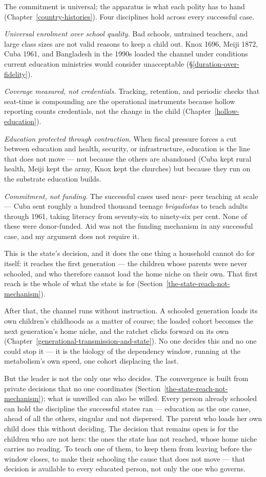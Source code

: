 \documentclass[12pt,letterpaper]{article}
\begin{document}
The commitment is universal; the apparatus is what each polity has
to hand (Chapter~\ref{country-histories}). Four disciplines hold
across every successful case.

\emph{Universal enrolment over school quality.} Bad schools,
untrained teachers, and large class sizes are not valid reasons to
keep a child out. Knox 1696, Meiji 1872, Cuba 1961, and Bangladesh
in the 1990s loaded the channel under conditions current education
ministries would consider unacceptable
(\S\ref{duration-over-fidelity}).

\emph{Coverage measured, not credentials.} Tracking, retention, and
periodic checks that seat-time is compounding are the operational
instruments because hollow reporting counts credentials, not the
change in the child (Chapter~\ref{hollow-education}).

\emph{Education protected through contraction.} When fiscal
pressure forces a cut between education and health, security, or
infrastructure, education is the line that does not move --- not
because the others are abandoned (Cuba kept rural health, Meiji
kept the army, Knox kept the churches) but because they run on
the substrate education builds.

\emph{Commitment, not funding.} The successful cases used near-
peer teaching at scale --- Cuba sent roughly a hundred thousand
teenage \emph{brigadistas} to teach adults through 1961, taking
literacy from seventy-six to ninety-six per cent. None of these
were donor-funded. Aid was not the funding mechanism in any
successful case, and my argument does not require it.

This is the state's decision, and it does the one thing a household
cannot do for itself: it reaches the first generation --- the children
whose parents were never schooled, and who therefore cannot load the
home niche on their own. That first reach is the whole of what the
state is for (Section~\ref{the-state-reach-not-mechanism}).

After that, the channel runs without instruction. A schooled
generation loads its own children's childhoods as a matter of course;
the loaded cohort becomes the next generation's home niche, and the
ratchet clicks forward on its own
(Chapter~\ref{generational-transmission-and-state}). No one decides
this and no one could stop it --- it is the biology of the dependency
window, running at the metabolism's own speed, one cohort displacing
the last.

But the leader is not the only one who decides. The convergence is
built from private decisions that no one coordinates
(Section~\ref{the-state-reach-not-mechanism}); what is unwilled can
also be willed. Every person already schooled can hold the discipline
the successful states ran --- education as the one cause, ahead of all
the others, singular and not dispersed. The parent who loads her own
child does this without deciding. The decision that remains open is for
the children who are not hers: the ones the state has not reached,
whose home niche carries no reading. To teach one of them, to keep them
from leaving before the window closes, to make their schooling the
cause that does not move --- that decision is available to every
educated person, not only the one who governs.
\end{document}
